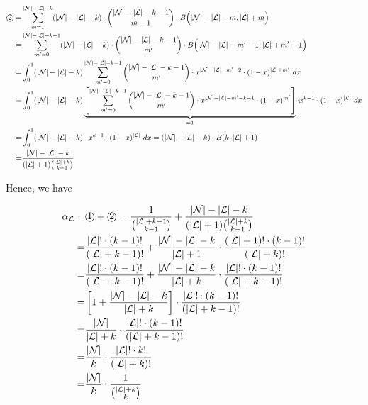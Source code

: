 \begin{small}
\begin{align*}
\text{\textcircled{2}} =& \sum_{m=1}^{|\mathcal{N}|-|\mathcal{L}|-k} (|\mathcal{N}|-|\mathcal{L}|-k)\cdot\binom{|\mathcal{N}|-|\mathcal{L}|-k-1}{m-1}\cdot B\Big(|\mathcal{N}|-|\mathcal{L}|-m,|\mathcal{L}|+m\Big)\\
=& \sum_{m'=0}^{|\mathcal{N}|-|\mathcal{L}|-k-1} (|\mathcal{N}|-|\mathcal{L}|-k)\cdot\binom{|\mathcal{N}|-|\mathcal{L}|-k-1}{m'}\cdot B\Big(|\mathcal{N}|-|\mathcal{L}|-m'-1,|\mathcal{L}|+m'+1\Big)\\
=& \int_0^1 (|\mathcal{N}|-|\mathcal{L}|-k)\sum_{m'=0}^{|\mathcal{N}|-|\mathcal{L}|-k-1}\binom{|\mathcal{N}|-|\mathcal{L}|-k-1}{m'}\cdot x^{|\mathcal{N}|-|\mathcal{L}|-m'-2}\cdot (1-x)^{|\mathcal{L}|+m'}\ dx\\
=& \int_0^1 (|\mathcal{N}|-|\mathcal{L}|-k)\underbrace{\left[\sum_{m'=0}^{|\mathcal{N}|-|\mathcal{L}|-k-1}\binom{|\mathcal{N}|-|\mathcal{L}|-k-1}{m'}\cdot x^{|\mathcal{N}|-|\mathcal{L}|-m'-k-1}\cdot (1-x)^{m'}\right]}_{=1}\cdot x^{k-1}\cdot(1-x)^{|\mathcal{L}|}\ dx\\
=& \int_0^1 (|\mathcal{N}|-|\mathcal{L}|-k)\cdot x^{k-1}\cdot(1-x)^{|\mathcal{L}|}\ dx
= (|\mathcal{N}|-|\mathcal{L}|-k)\cdot B(k, |\mathcal{L}|+1) \\
=&\frac{|\mathcal{N}|-|\mathcal{L}|-k}{(|\mathcal{L}|+1)\binom{|\mathcal{L}|+k}{k-1}}
\end{align*}
\end{small}

Hence, we have


\begin{small}
\begin{align*}
\alpha_\mathcal{L} =& \text{\textcircled{1}}+\text{\textcircled{2}} = \frac{1}{\binom{|\mathcal{L}|+k-1}{k-1}} + \frac{|\mathcal{N}|-|\mathcal{L}|-k}{(|\mathcal{L}|+1)\binom{|\mathcal{L}|+k}{k-1}}\\
=& \frac{|\mathcal{L}|!\cdot (k-1)!}{(|\mathcal{L}|+k-1)!} + \frac{|\mathcal{N}|-|\mathcal{L}|-k}{|\mathcal{L}|+1}\cdot \frac{(|\mathcal{L}|+1)!\cdot (k-1)!}{(|\mathcal{L}|+k)!}\\
=& \frac{|\mathcal{L}|!\cdot (k-1)!}{(|\mathcal{L}|+k-1)!} + \frac{|\mathcal{N}|-|\mathcal{L}|-k}{|\mathcal{L}|+k}\cdot\frac{|\mathcal{L}|!\cdot (k-1)!}{(|\mathcal{L}|+k-1)!}\\
=& \left[1+\frac{|\mathcal{N}|-|\mathcal{L}|-k}{|\mathcal{L}|+k}\right]\cdot \frac{|\mathcal{L}|!\cdot (k-1)!}{(|\mathcal{L}|+k-1)!}\\
=& \frac{|\mathcal{N}|}{|\mathcal{L}|+k}\cdot \frac{|\mathcal{L}|!\cdot (k-1)!}{(|\mathcal{L}|+k-1)!}\\
=& \frac{|\mathcal{N}|}{k}\cdot \frac{|\mathcal{L}|!\cdot k!}{(|\mathcal{L}|+k)!}\\
=& \frac{|\mathcal{N}|}{k}\cdot\frac{1}{\binom{|\mathcal{L}|+k}{k}}
\end{align*}
\end{small}

